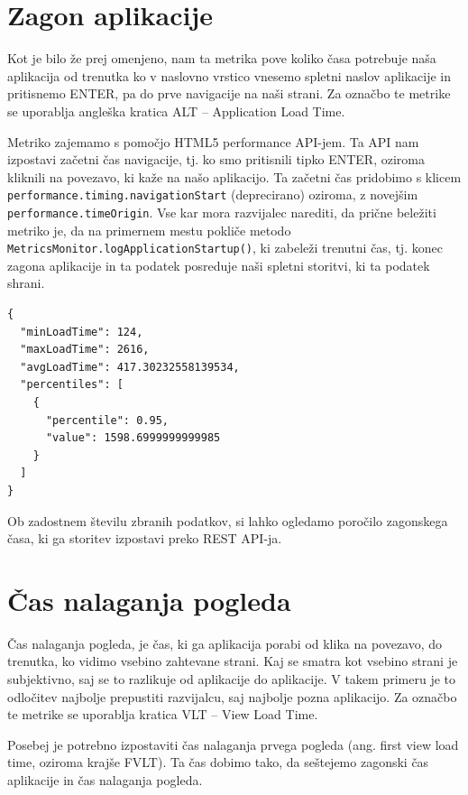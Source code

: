 \documentclass[a4paper, 12pt]{book}
\begin{document}
\section{Zagon aplikacije}
\label{ch2:sec1}
Kot je bilo že prej omenjeno, nam ta metrika pove koliko časa potrebuje naša aplikacija od trenutka ko v naslovno vrstico vnesemo spletni naslov aplikacije in pritisnemo ENTER, pa do prve navigacije na naši strani. Za označbo te metrike se uporablja angleška kratica ALT – Application Load Time.

Metriko zajemamo s pomočjo HTML5 performance API-jem. Ta API nam izpostavi začetni čas navigacije, tj. ko smo pritisnili tipko ENTER, oziroma kliknili na povezavo, ki kaže na našo aplikacijo. Ta začetni čas pridobimo s klicem \verb|performance.timing.navigationStart| (deprecirano) oziroma, z novejšim \verb|performance.timeOrigin|. Vse kar mora razvijalec narediti, da prične beležiti metriko je, da na primernem mestu pokliče metodo \\ \verb|MetricsMonitor.logApplicationStartup()|, ki zabeleži trenutni čas, tj. konec zagona aplikacije in ta podatek posreduje naši spletni storitvi, ki ta podatek shrani.

\begin{lstlisting}[label=app_startup_report, caption=Poročilo zagonskega časa aplikacije]
{
  "minLoadTime": 124,
  "maxLoadTime": 2616,
  "avgLoadTime": 417.30232558139534,
  "percentiles": [
    {
      "percentile": 0.95,
      "value": 1598.6999999999985
    }
  ]
}
\end{lstlisting}

Ob zadostnem številu zbranih podatkov, si lahko ogledamo poročilo zagonskega časa, ki ga storitev izpostavi preko REST API-ja.


\section{Čas nalaganja pogleda}
\label{ch2:sec2}

Čas nalaganja pogleda, je čas, ki ga aplikacija porabi od klika na povezavo, do trenutka, ko vidimo vsebino zahtevane strani. Kaj se smatra kot vsebino strani je subjektivno, saj se to razlikuje od aplikacije do aplikacije. V takem primeru je to odločitev najbolje prepustiti razvijalcu, saj najbolje pozna aplikacijo. Za označbo te metrike se uporablja kratica VLT – View Load Time.

Posebej je potrebno izpostaviti čas nalaganja prvega pogleda (ang. first view load time, oziroma krajše FVLT). Ta čas dobimo tako, da seštejemo zagonski čas aplikacije in čas nalaganja pogleda.
\end{document}
